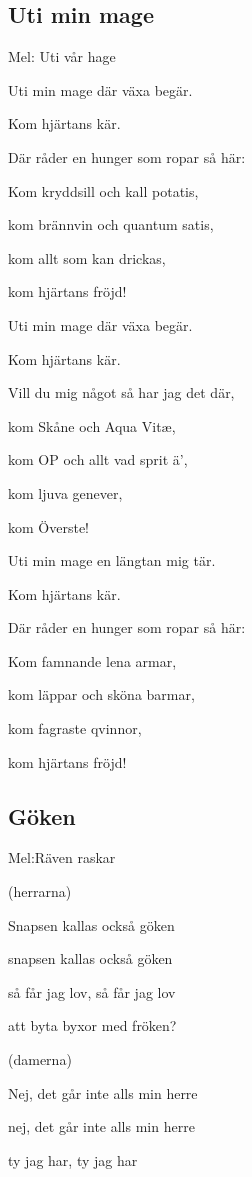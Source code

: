 \subsection{\textbf{Uti min mage}}

Mel:  Uti vår hage\bigskip

Uti min mage där växa begär.

Kom hjärtans kär.

Där råder en hunger som ropar så här:

Kom kryddsill och kall potatis,

kom brännvin och quantum satis,

kom allt som kan drickas,

kom hjärtans fröjd!\bigskip

Uti min mage där växa begär.

Kom hjärtans kär.

Vill du mig något så har jag det där,

kom Skåne och Aqua Vitæ,

kom OP och allt vad sprit ä’,

kom ljuva genever,

kom Överste!\bigskip

Uti min mage en längtan mig tär.

Kom hjärtans kär.

Där råder en hunger som ropar så här:

Kom famnande lena armar,

kom läppar och sköna barmar,

kom fagraste qvinnor,

kom hjärtans fröjd! \bigskip

\subsection{\textbf{Göken}}

Mel:Räven raskar \bigskip

(herrarna)

Snapsen kallas också göken

snapsen kallas också göken

så får jag lov, så får jag lov

att byta byxor med fröken? \bigskip

(damerna)

Nej, det går inte alls min herre

nej, det går inte alls min herre

ty jag har, ty jag har

